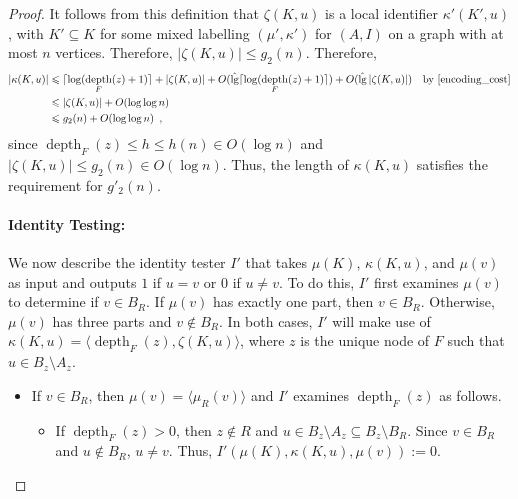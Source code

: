 \documentclass[twoside,leqno]{article}
\let\eqref\cref
\renewcommand{\le}{\leqslant}
\renewcommand{\leq}{\leqslant}
\DeclareMathOperator{\depth}{depth}
\DeclareMathOperator{\lgg}{\hat{lg}}
\newcommand{\Oh}{O}
\DeclarePairedDelimiter{\ceil}{\lceil}{\rceil}
\begin{document}
\begin{proof}
  It follows from this definition that $\zeta(K,u)$ is a local identifier $\kappa'(K',u)$, with $K'\subseteq K$ for some mixed labelling $(\mu',\kappa')$ for $(A,I)$ on a graph with at most $n$ vertices.  Therefore, $|\zeta(K,u)|\le g_2(n)$.  Therefore,
  \begin{align*}
    |\kappa(K,u)|
     & \le \ceil{\log(\depth_F(z)+1)} + |\zeta(K,u)|
    + \Oh(\lgg\ceil{\log(\depth_F(z)+1)}) + \Oh(\lgg|\zeta(K,u)|)
     & \text{by \eqref{encoding_cost}}               \\
     & \leq |\zeta(K,u)| + \Oh(\log\log n)           \\
     & \leq g_2(n) +  \Oh(\log\log n)\enspace,
  \end{align*}
  since $\depth_F(z)\le h\le h(n)\in \Oh(\log n)$ and $|\zeta(K,u)|\le g_2(n)\in\Oh(\log n)$.  Thus, the length of $\kappa(K,u)$ satisfies the requirement for $g'_2(n)$.

  \paragraph{Identity Testing:}
  We now describe the identity tester $I'$ that takes $\mu(K)$, $\kappa(K,u)$, and $\mu(v)$ as input and outputs $1$ if $u=v$ or $0$ if $u\neq v$.  To do this, $I'$ first examines $\mu(v)$ to determine if $v\in B_R$.  If $\mu(v)$ has exactly one part, then $v\in B_R$. Otherwise, $\mu(v)$ has three parts and $v\not\in B_R$.
  In both cases, $I'$ will make use of $\kappa(K,u)=\langle\depth_F(z),\zeta(K,u)\rangle$, where $z$ is the unique node of $F$ such that $u\in B_z\setminus A_z$.
  \begin{itemize}
    \item If $v\in B_R$, then $\mu(v)=\langle\mu_R(v)\rangle$ and $I'$ examines  $\depth_F(z)$ as follows.
    \begin{itemize}
      \item If $\depth_F(z)> 0$, then $z\not\in R$ and $u\in B_z\setminus A_z\subseteq B_z\setminus B_R$.  Since $v\in B_R$ and $u\not\in B_R$, $u\neq v$.  Thus, $I'(\mu(K),\kappa(K,u),\mu(v)):=0$.


\end{itemize}
\end{itemize}
\end{proof}
\end{document}
